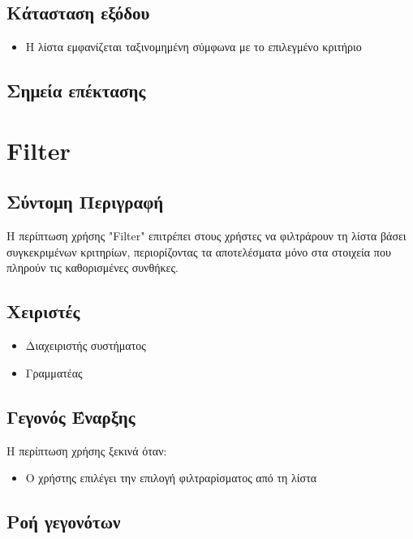 \documentclass[12pt,a4paper,twoside]{book}
\begin{document}
\subsection{Κάτασταση εξόδου} %
\begin{itemize}
  \item Η λίστα εμφανίζεται ταξινομημένη σύμφωνα με το επιλεγμένο κριτήριο
\end{itemize}

\subsection{Σημεία επέκτασης}

\section{Filter}

\subsection{Σύντομη Περιγραφή}
Η περίπτωση χρήσης "Filter" επιτρέπει στους χρήστες να φιλτράρουν τη λίστα βάσει συγκεκριμένων κριτηρίων, περιορίζοντας τα αποτελέσματα μόνο στα στοιχεία που πληρούν τις καθορισμένες συνθήκες. %

\subsection{Χειριστές}
\begin{itemize}
  \item Διαχειριστής συστήματος
  \item Γραμματέας
\end{itemize}

\subsection{Γεγονός Έναρξης}
Η περίπτωση χρήσης ξεκινά όταν:
\begin{itemize}
  \item Ο χρήστης επιλέγει την επιλογή φιλτραρίσματος από τη λίστα %
\end{itemize}

\subsection{Ροή γεγονότων}
\end{document}
